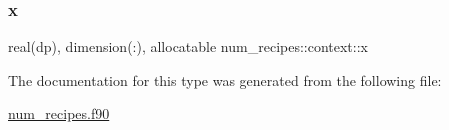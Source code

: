 \subsubsection{\texorpdfstring{x}{x}}
{\footnotesize\ttfamily real(dp), dimension(\+:), allocatable num\+\_\+recipes\+::context\+::x\hspace{0.3cm}{\ttfamily [private]}}



The documentation for this type was generated from the following file\+:\begin{DoxyCompactItemize}
\item 
\hyperlink{num__recipes_8f90}{num\+\_\+recipes.\+f90}\end{DoxyCompactItemize}
